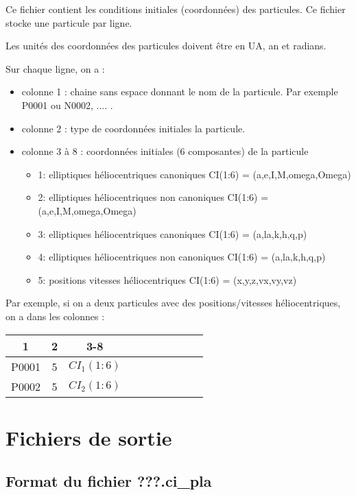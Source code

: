 \documentclass[11pt]{article}
\begin{document}
Ce fichier contient les conditions initiales (coordonn\'ees) des particules. 
Ce fichier stocke une particule par ligne.

Les unit\'es des coordonn\'ees des particules doivent \^etre en UA, an et radians.

Sur chaque ligne, on a :
\begin{itemize}
\item colonne 1 : chaine sans espace donnant le nom de la particule. Par exemple P0001 ou N0002, .... .
\item colonne 2 :  type de coordonn\'ees initiales la particule.
\item colonne 3 \`a 8 :  coordonn\'ees initiales (6 composantes)  de la particule
\begin{itemize}
\item 1:  elliptiques h\'eliocentriques canoniques
	     CI(1:6) = (a,e,I,M,omega,Omega)
\item 2:  elliptiques h\'eliocentriques non canoniques
	     CI(1:6) = (a,e,I,M,omega,Omega)
\item 3:  elliptiques h\'eliocentriques canoniques
	     CI(1:6) = (a,la,k,h,q,p)
\item 4:  elliptiques h\'eliocentriques non canoniques
	     CI(1:6) = (a,la,k,h,q,p)
\item 5:  positions vitesses h\'eliocentriques
	     CI(1:6) = (x,y,z,vx,vy,vz)
\end{itemize}

\end{itemize}

Par exemple, si on a deux particules avec des positions/vitesses h\'eliocentriques, on a dans les colonnes :
 
\begin{tabular}{|c|c|c|c|c|c|c|c|c|c|} \hline
1 &  2 &  3-8 \\ \hline
P0001 &5 &$CI_1(1:6)$ \\    \hline
P0002 &5 &$CI_2(1:6)$ \\    \hline
\end{tabular}

\section{Fichiers de sortie}

\subsection{Format du fichier {\bf ???.ci\_pla} }
\end{document}

